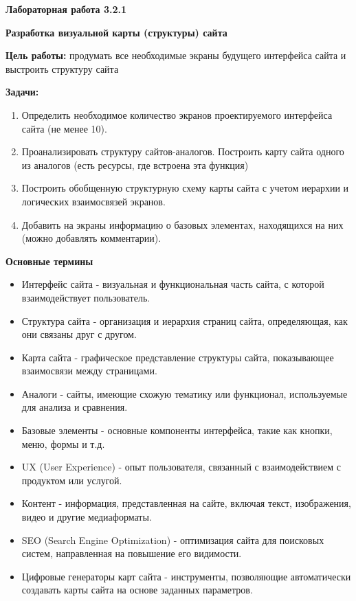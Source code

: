 
\graphicspath{ {3.2.1/models/} }

\pagestyle{fancy}
\fancyhead{}
\renewcommand{\headrulewidth}{0pt}


\begin{center}
    \textbf{Лабораторная работа 3.2.1}

    \textbf{Разработка визуальной карты (структуры) сайта}
\end{center}

\textbf{Цель работы:} продумать все необходимые экраны будущего интерфейса сайта и выстроить структуру сайта
\bigskip

\textbf{Задачи:}

\begin{enumerate}
    \item Определить необходимое количество экранов проектируемого интерфейса сайта (не менее 10).
    \item Проанализировать структуру сайтов-аналогов. Построить карту сайта одного из аналогов (есть ресурсы, где встроена эта функция)
    \item Построить обобщенную структурную схему карты сайта с учетом иерархии и логических взаимосвязей экранов.
    \item Добавить на экраны информацию о базовых элементах, находящихся на них (можно добавлять комментарии).
\end{enumerate}
\bigskip

\textbf{Основные термины}

\begin{itemize}
    \item Интерфейс сайта - визуальная и функциональная часть сайта, с которой взаимодействует пользователь.
    \item Структура сайта - организация и иерархия страниц сайта, определяющая, как они связаны друг с другом.
    \item Карта сайта - графическое представление структуры сайта, показывающее взаимосвязи между страницами.
    \item Аналоги - сайты, имеющие схожую тематику или функционал, используемые для анализа и сравнения.
    \item Базовые элементы - основные компоненты интерфейса, такие как кнопки, меню, формы и т.д.
    \item UX (User Experience) - опыт пользователя, связанный с взаимодействием с продуктом или услугой.
    \item Контент - информация, представленная на сайте, включая текст, изображения, видео и другие медиаформаты.
    \item SEO (Search Engine Optimization) - оптимизация сайта для поисковых систем, направленная на повышение его видимости.
    \item Цифровые генераторы карт сайта - инструменты, позволяющие автоматически создавать карты сайта на основе заданных параметров.
\end{itemize}
\bigskip


